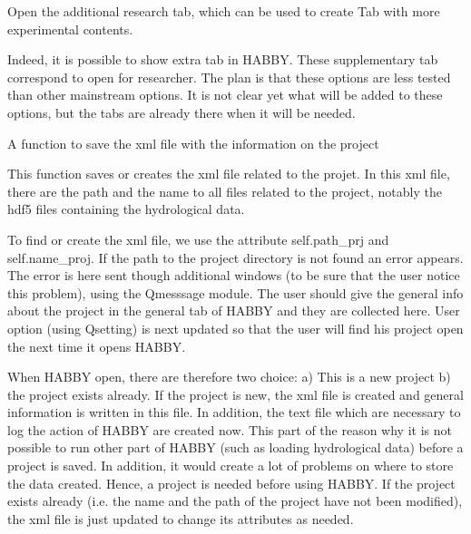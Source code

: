 \documentclass[letterpaper,10pt,english]{sphinxmanual}
\begin{document}
\begin{fulllineitems}
\begin{fulllineitems}
\end{fulllineitems}


\begin{fulllineitems}
\label{\detokenize{index:src_GUI.Main_windows_1.MainWindows.open_rech}}
Open the additional research tab, which can be used to create Tab with more experimental contents.

Indeed, it is possible to show extra tab in HABBY. These supplementary tab correspond to open for researcher.
The plan is that these options are less tested than other mainstream options. It is not clear yet what
will be added to these options, but the tabs are already there when it will be needed.

\end{fulllineitems}


\begin{fulllineitems}
\label{\detokenize{index:src_GUI.Main_windows_1.MainWindows.save_project}}
A function to save the xml file with the information on the project


This function saves or creates the xml file related to the projet. In this xml file, there are the path and
the name to all files related to the project, notably the hdf5 files containing the hydrological data.

To find or create the xml file, we use the attribute self.path\_prj and self.name\_proj. If the path to
the project directory is not found an error appears. The error is here sent though additional windows
(to be sure that the user notice this problem), using the Qmesssage module. The user should give the general
info about the project in the general tab of HABBY and they are collected here. User option (using Qsetting)
is next updated so that the user will find his project open the next time it opens HABBY.

When HABBY open, there are therefore  two choice: a) This is a new project b) the project exists already.
If the project is new, the xml file is created and general information is written in this file. In addition,
the text file which are necessary to log the action of HABBY are created now. This part of the reason why it
is not possible to run other part of HABBY (such as loading hydrological data) before a project is saved.
In addition, it would create a lot of problems on where to store the data created. Hence, a project is needed
before using HABBY. If the project exists already (i.e. the name and the path of the project have not been
modified), the xml file is just updated to change its attributes as needed.


\end{fulllineitems}
\end{fulllineitems}
\end{document}

